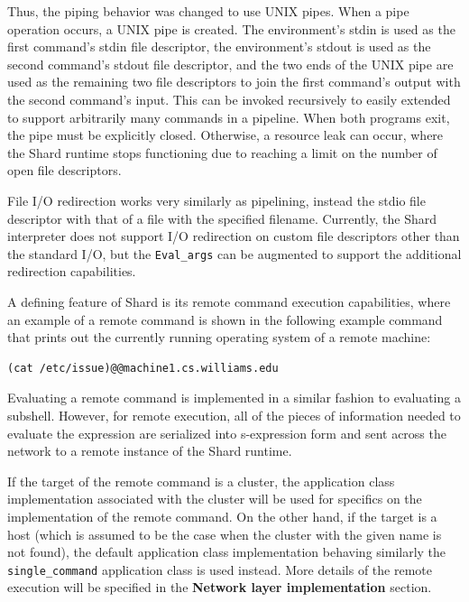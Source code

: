 \documentclass[twoside]{report}
\begin{document}
Thus, the piping behavior was changed to use UNIX pipes.
When a pipe operation occurs, a UNIX pipe is created.
The environment's stdin is used as the first command's stdin file descriptor, the environment's stdout is used as the second command's stdout file descriptor, and the two ends of the UNIX pipe are used as the remaining two file descriptors to join the first command's output with the second command's input.
This can be invoked recursively to easily extended to support arbitrarily many commands in a pipeline.
When both programs exit, the pipe must be explicitly closed.
Otherwise, a resource leak can occur, where the Shard runtime stops functioning due to reaching a limit on the number of open file descriptors.

File I/O redirection works very similarly as pipelining, instead the stdio file descriptor with that of a file with the specified filename.
Currently, the Shard interpreter does not support I/O redirection on custom file descriptors other than the standard I/O, but the \texttt{Eval\_args} can be augmented to support the additional redirection capabilities.

A defining feature of Shard is its remote command execution capabilities, where an example of a remote command is shown in the following example command that prints out the currently running operating system of a remote machine:

\begin{lstlisting}[language=shard]
(cat /etc/issue)@@machine1.cs.williams.edu
\end{lstlisting}

Evaluating a remote command is implemented in a similar fashion to evaluating a subshell.
However, for remote execution, all of the pieces of information needed to evaluate the expression are serialized into s-expression form and sent across the network to a remote instance of the Shard runtime.

If the target of the remote command is a cluster, the application class implementation associated with the cluster will be used for specifics on the implementation of the remote command.
On the other hand, if the target is a host (which is assumed to be the case when the cluster with the given name is not found), the default application class implementation behaving similarly the \texttt{single\_command} application class is used instead.
More details of the remote execution will be specified in the \textbf{Network layer implementation} section.
\end{document}

